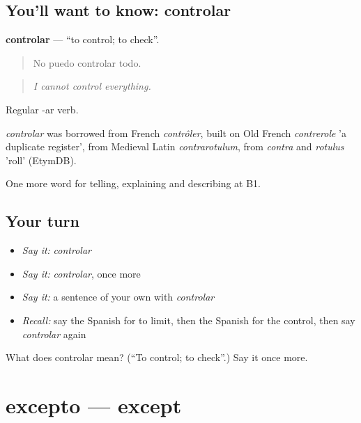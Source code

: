 \subsection*{You'll want to know: controlar}
\textbf{controlar} — \textquotedblleft{}to control; to check\textquotedblright{}.

\begin{quote}
No puedo controlar todo.
\end{quote}

\begin{quote}
\emph{I cannot control everything.}
\end{quote}

Regular -ar verb.

\begin{cousinweb}
\emph{controlar} was borrowed from French \emph{contrôler}, built on Old French \emph{contrerole} 'a duplicate register', from Medieval Latin \emph{contrarotulum}, from \emph{contra} and \emph{rotulus} 'roll' (EtymDB).
\end{cousinweb}

\begin{grammarlens}[title={What you've built}]
One more word for telling, explaining and describing at B1.
\end{grammarlens}

\subsection*{Your turn}
\begin{itemize}
\raggedright
  \item \emph{Say it:} \emph{controlar}
  \item \emph{Say it:} \emph{controlar}, once more
  \item \emph{Say it:} a sentence of your own with \emph{controlar}
  \item \emph{Recall:} say the Spanish for to limit, then the Spanish for the control, then say \emph{controlar} again
\end{itemize}

\begin{tcolorbox}[breakable,colback=teal!4,colframe=teal!35!black,title={Before you move on}]
What does controlar mean? (\textquotedblleft{}To control; to check\textquotedblright{}.) Say it once more.
\end{tcolorbox}
\section[excepto]{excepto — except}

